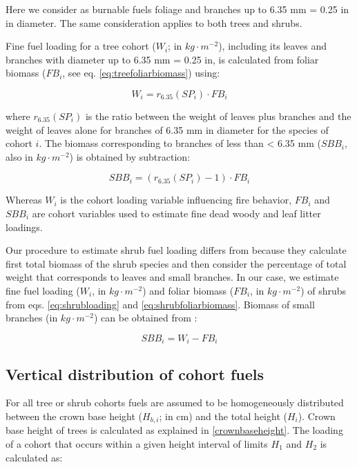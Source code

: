 \documentclass[]{book}
\begin{document}
Here we consider as burnable fuels foliage and branches up to 6.35 mm =
0.25 in in diameter. The same consideration applies to both trees and
shrubs.

Fine fuel loading for a tree cohort (\(W_{i}\); in \(kg\cdot m^{-2}\)),
including its leaves and branches with diameter up to 6.35 mm = 0.25 in,
is calculated from foliar biomass (\(FB_{i}\), see eq.
\eqref{eq:treefoliarbiomass}) using:

\begin{equation}
W_{i} = r_{6.35}(SP_i)\cdot FB_{i}
\end{equation}

where \(r_{6.35}(SP_i)\) is the ratio between the weight of leaves plus
branches and the weight of leaves alone for branches of 6.35 mm in
diameter for the species of cohort \(i\). The biomass corresponding to
branches of less than \textless{} 6.35 mm (\(SBB_{i}\), also in
\(kg\cdot m^{-2}\)) is obtained by subtraction:

\begin{equation}
SBB_{i} = (r_{6.35}(SP_i)-1)\cdot FB_{i}
\end{equation}

Whereas \(W_{i}\) is the cohort loading variable influencing fire
behavior, \(FB_{i}\) and \(SBB_{i}\) are cohort variables used to
estimate fine dead woody and leaf litter loadings.

Our procedure to estimate shrub fuel loading differs from
\citet{Prichard2013} because they calculate first total biomass of the
shrub species and then consider the percentage of total weight that
corresponds to leaves and small branches. In our case, we estimate fine
fuel loading (\(W_{i}\), in \(kg \cdot m^{-2}\)) and foliar biomass
(\(FB_i\), in \(kg \cdot m^{-2}\)) of shrubs from eqs.
\eqref{eq:shrubloading} and \eqref{eq:shrubfoliarbiomass}. Biomass of small
branches (in \(kg \cdot m^{-2}\)) can be obtained from :

\begin{equation}
SBB_{i} = W_{i} - FB_{i}
\end{equation}

\subsection{Vertical distribution of cohort
fuels}\label{vertical-distribution-of-cohort-fuels}

For all tree or shrub cohorts fuels are assumed to be homogeneously
distributed between the crown base height (\(H_{b,i}\); in cm) and the
total height (\(H_i\)). Crown base height of trees is calculated as
explained in \ref{crownbaseheight}. The loading of a cohort that occurs
within a given height interval of limits \(H_1\) and \(H_2\) is
calculated as:
\end{document}
